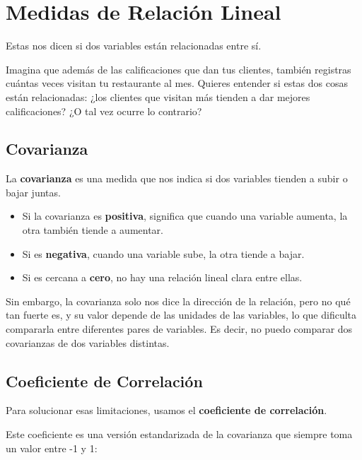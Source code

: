 \documentclass[
  spanish,
  letterpaper,
  DIV=11,
  numbers=noendperiod]{scrreprt}
\providecommand{\tightlist}{%
  \setlength{\itemsep}{0pt}\setlength{\parskip}{0pt}}
\begin{document}
\section{Medidas de Relación
Lineal}\label{medidas-de-relaciuxf3n-lineal}

Estas nos dicen si dos variables están relacionadas entre sí.

Imagina que además de las calificaciones que dan tus clientes, también
registras cuántas veces visitan tu restaurante al mes. Quieres entender
si estas dos cosas están relacionadas: ¿los clientes que visitan más
tienden a dar mejores calificaciones? ¿O tal vez ocurre lo contrario?

\subsection{Covarianza}\label{covarianza}

La \textbf{covarianza} es una medida que nos indica si dos variables
tienden a subir o bajar juntas.

\begin{itemize}
\tightlist
\item
  Si la covarianza es \textbf{positiva}, significa que cuando una
  variable aumenta, la otra también tiende a aumentar.\\
\item
  Si es \textbf{negativa}, cuando una variable sube, la otra tiende a
  bajar.\\
\item
  Si es cercana a \textbf{cero}, no hay una relación lineal clara entre
  ellas.
\end{itemize}

Sin embargo, la covarianza solo nos dice la dirección de la relación,
pero no qué tan fuerte es, y su valor depende de las unidades de las
variables, lo que dificulta compararla entre diferentes pares de
variables. Es decir, no puedo comparar dos covarianzas de dos variables
distintas.

\subsection{Coeficiente de
Correlación}\label{coeficiente-de-correlaciuxf3n}

Para solucionar esas limitaciones, usamos el \textbf{coeficiente de
correlación}.

Este coeficiente es una versión estandarizada de la covarianza que
siempre toma un valor entre -1 y 1:
\end{document}
